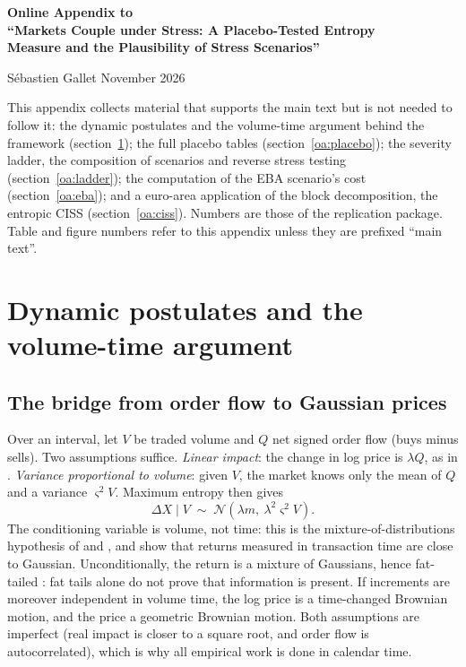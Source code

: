 \documentclass[11pt]{article}
\theoremstyle{definition}
\begin{document}
\begin{center}
{\large\bfseries Online Appendix to\\ ``Markets Couple under Stress: A Placebo-Tested Entropy\\ Measure and the Plausibility of Stress Scenarios''\par}
\vspace{6pt} Sébastien Gallet \quad November 2026
\end{center}
\onehalfspacing
\noindent This appendix collects material that supports the main text but is
not needed to follow it: the dynamic postulates and the volume-time argument
behind the framework (section~\ref{oa:theory}); the full placebo tables
(section~\ref{oa:placebo}); the severity ladder, the composition of scenarios
and reverse stress testing (section~\ref{oa:ladder}); the computation of the
EBA scenario's cost (section~\ref{oa:eba}); and a euro-area application of the
block decomposition, the entropic CISS (section~\ref{oa:ciss}). Numbers are
those of the replication package. Table and figure numbers refer to this
appendix unless they are prefixed ``main text''.

\section{Dynamic postulates and the volume-time argument}
\label{oa:theory}
\subsection{The bridge from order flow to Gaussian prices}
\label{oa:pont}

Over an interval, let $V$ be traded volume and $Q$ net signed order flow (buys
minus sells). Two assumptions suffice. \emph{Linear impact}: the change in log
price is $\lambda Q$, as in \citet{kyle1985}. \emph{Variance proportional to
volume}: given $V$, the market knows only the mean of $Q$ and a variance
$\varsigma^2V$. Maximum entropy then gives
\begin{equation}
\Delta X \mid V \;\sim\; \mathcal N\!\left(\lambda m,\ \lambda^2\varsigma^2 V\right).
\end{equation}
The conditioning variable is volume, not time: this is the
mixture-of-distributions hypothesis of \citet{clark1973} and
\citet{tauchen1983}, and \citet{ane2000} show that returns measured in
transaction time are close to Gaussian. Unconditionally, the return is a
mixture of Gaussians, hence fat-tailed \citep{mandelbrot1967}: fat tails alone
do not prove that information is present. If increments are moreover
independent in volume time, the log price is a time-changed Brownian motion,
and the price a geometric Brownian motion. Both assumptions are imperfect
(real impact is closer to a square root, and order flow is autocorrelated),
which is why all empirical work is done in calendar time.
\end{document}
